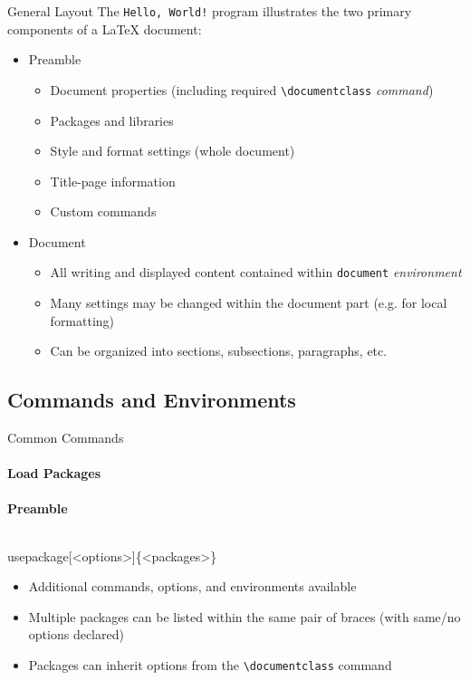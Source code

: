 \documentclass{beamer}
\begin{document}
\begin{frame}{General Layout}
	The \texttt{Hello, World!} program illustrates the two primary components of a LaTeX document:
		\begin{itemize}
			\item<1-> Preamble
				\begin{itemize}
					\item Document properties (including required \texttt{\textbackslash documentclass} \textit{command})
					\item Packages and libraries
					\item Style and format settings (whole document)
					\item Title-page information
					\item Custom commands
				\end{itemize}
			\item<2-> Document
				\begin{itemize}
					\item All writing and displayed content contained within \texttt{document} \textit{environment}
					\item Many settings may be changed within the document part (e.g. for local formatting)
					\item Can be organized into sections, subsections, paragraphs, etc.
				\end{itemize}
		\end{itemize}
\end{frame}

\subsection{Commands and Environments}

\begin{frame}{Common Commands}
\framesubtitle{Load Packages}
	\textbf{Preamble}
	\begin{semiverbatim}
		\\usepackage[<options>]\{<packages>\}
	\end{semiverbatim}
	\begin{itemize}
		\item Additional commands, options, and environments available
		\item Multiple packages can be listed within the same pair of braces (with same/no options declared)
		\item Packages can inherit options from the \texttt{\textbackslash documentclass} command
	\end{itemize}
\end{frame}
\end{document}
